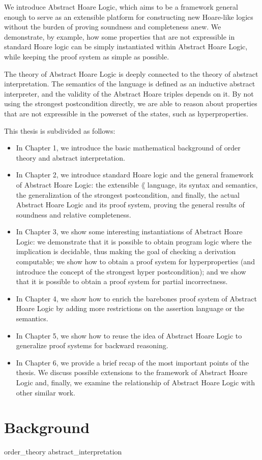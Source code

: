 We introduce Abstract Hoare Logic, which aims to be a framework general enough
to serve as an extensible platform for constructing new Hoare-like logics
without the burden of proving soundness and completeness anew. We demonstrate,
by example, how some properties that are not expressible in standard Hoare
logic can be simply instantiated within Abstract Hoare Logic, while keeping the
proof system as simple as possible.

The theory of Abstract Hoare Logic is deeply connected to the theory of
abstract interpretation. The semantics of the language is defined as an
inductive abstract interpreter, and the validity of the Abstract Hoare triples
depends on it. By not using the strongest postcondition directly, we are able
to reason about properties that are not expressible in the powerset of the
states, such as hyperproperties.


This thesis is subdivided as follows:
\begin{itemize}
  \item In Chapter 1, we introduce the basic mathematical background of order
    theory and abstract interpretation.

  \item In Chapter 2, we introduce standard Hoare logic and the general
    framework of Abstract Hoare Logic: the extensible $\lang$ language, its
    syntax and semantics, the generalization of the strongest postcondition,
    and finally, the actual Abstract Hoare Logic and its proof system, proving
    the general results of soundness and relative completeness.

  \item In Chapter 3, we show some interesting instantiations of Abstract Hoare
    Logic: we demonstrate that it is possible to obtain program logic where the
    implication is decidable, thus making the goal of checking a derivation
    computable; we show how to obtain a proof system for hyperproperties (and
    introduce the concept of the strongest hyper postcondition); and we show
    that it is possible to obtain a proof system for partial incorrectness.

  \item In Chapter 4, we show how to enrich the barebones proof system of
    Abstract Hoare Logic by adding more restrictions on the assertion language
    or the semantics.

  \item In Chapter 5, we show how to reuse the idea of Abstract Hoare Logic to
    generalize proof systems for backward reasoning.

  \item In Chapter 6, we provide a brief recap of the most important points of
    the thesis. We discuss possible extensions to the framework of Abstract
    Hoare Logic and, finally, we examine the relationship of Abstract Hoare
    Logic with other similar work.
\end{itemize}

\chapter{Background}

{order_theory}
{abstract_interpretation}
